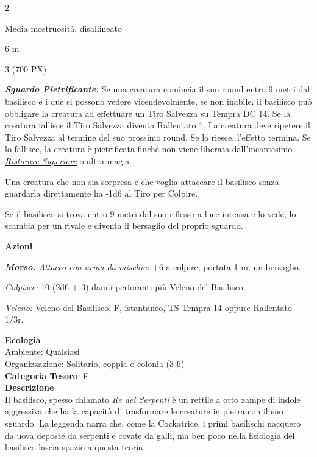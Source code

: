 \begin{multicols}{2}
{
\begin{description}[noitemsep, topsep=0pt, parsep=0pt, partopsep=0pt, itemsep=1pt, leftmargin=2.35cm,  labelwidth=2.2cm, itemindent=0cm, listparindent=0pt] %
\setlength{\baselineskip}{10pt}
\item[\textbf{Taglia/Tipo}] Media mostruosità, disallineato
\item[\textbf{Caratt.}] 
\item[\textbf{Punti Ferita}] 
\item[\textbf{Movimento}] 6 m
\item[\textbf{Tiri Salvez.}] 
\item[\textbf{Sensi}] 
\item[\textbf{Sfida}] 3 (700 PX)
\end{description}
\smallskip

\emph{\textbf{Sguardo Pietrificante.}} Se una creatura comincia il suo round entro 9 metri dal basilisco e i due si possono vedere vicendevolmente, se non inabile, il basilisco può obbligare la creatura ad effettuare un Tiro Salvezza su Tempra DC 14. Se la creatura fallisce il Tiro Salvezza diventa Rallentato 1. La creatura deve ripetere il Tiro Salvezza al termine del suo prossimo round. Se lo riesce, l'effetto termina. Se lo fallisce, la creatura è pietrificata finché non viene liberata dall'incantesimo \emph{\hyperlink{Ristorare Superiore}{Ristorare Superiore}} o altra magia.

Una creatura che non sia sorpresa e che voglia attaccare il basilisco senza guardarla direttamente ha -1d6 al Tiro per Colpire.

Se il basilisco si trova entro 9 metri dal suo riflesso a luce intensa e lo vede, lo scambia per un rivale e diventa il bersaglio del proprio sguardo.

\textbf{Azioni}

\emph{\textbf{Morso.} Attacco con arma da mischia}: +6 a colpire, portata 1 m, un bersaglio.

\emph{Colpisce:} 10 (2d6 + 3) danni perforanti più Veleno del Basilisco.

\emph{Veleno:} Veleno del Basilisco, F, istantaneo, TS Tempra 14 oppure Rallentato 1/3r.

\textbf{Ecologia}\\
Ambiente: Qualsiasi\\
Organizzazione: Solitario, coppia o colonia (3-6)\\
\textbf{Categoria Tesoro}: F\\
\textbf{Descrizione}\\
Il basilisco, spesso chiamato \emph{Re dei Serpenti} è un rettile a otto zampe di indole aggressiva che ha la capacità di trasformare le creature in pietra con il suo sguardo. La leggenda narra che, come la Cockatrice, i primi basilischi nacquero da uova deposte da serpenti e covate da galli, ma ben poco nella fisiologia del basilisco lascia spazio a questa teoria.

}
\end{multicols}
